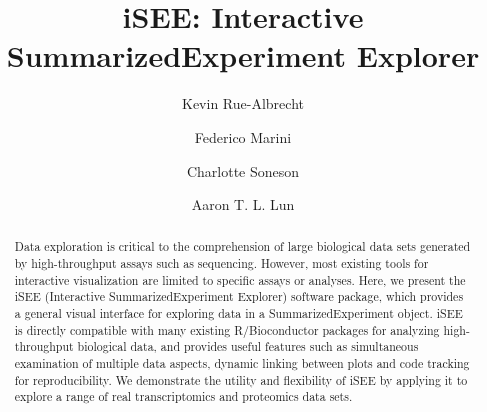 \documentclass[10pt,a4paper,twocolumn]{article}
\begin{document}
\title{iSEE: Interactive SummarizedExperiment Explorer}
\author[1,$\dagger$]{Kevin Rue-Albrecht}
\author[2,3,$\dagger$]{Federico Marini}
\author[4,$\dagger$]{Charlotte Soneson}
\author[5,$\dagger$,$\ast$]{Aaron T. L. Lun}



\maketitle
\thispagestyle{fancy}


\begin{abstract}
Data exploration is critical to the comprehension of large biological data sets generated by high-throughput assays such as sequencing.
However, most existing tools for interactive visualization are limited to specific assays or analyses.
Here, we present the iSEE (Interactive SummarizedExperiment Explorer) software package, which provides a general visual interface for exploring data in a SummarizedExperiment object.
iSEE is directly compatible with many existing R/Bioconductor packages for analyzing high-throughput biological data,
and provides useful features such as simultaneous examination of multiple data aspects, dynamic linking between plots and code tracking for reproducibility.
We demonstrate the utility and flexibility of iSEE by applying it to explore a range of real transcriptomics and proteomics data sets.


\end{abstract}
\end{document}
